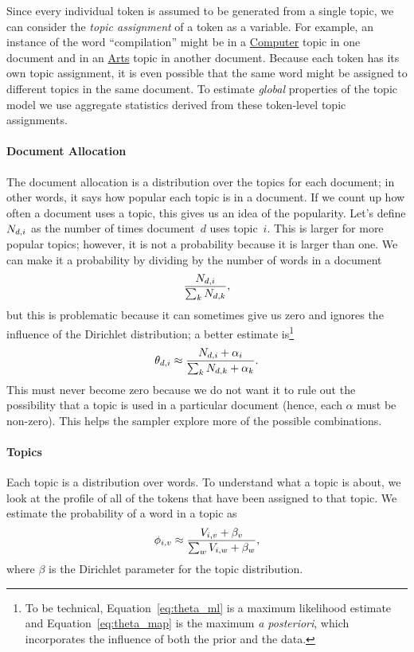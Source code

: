 Since every individual token is assumed to be generated from a single topic,
we can consider the {\em topic assignment} of a token as a variable.  For example,
an instance of the word ``compilation'' might be in a \underline{Computer} topic in one
document and in an \underline{Arts} topic in another document.  Because each token has its own
topic assignment, it is even possible that the
same word might be assigned to different topics in the same document.
To estimate \emph{global} properties of the topic model we use aggregate statistics derived from these token-level topic assignments.

\paragraph{Document Allocation} The document allocation is a distribution over
the topics for each document; in other words, it says how popular each topic is
in a document.  If we count up how often a document uses a topic, this gives us
an idea of the popularity.  Let's define $N_{d,i}$ as the number of times
document~$d$ uses topic~$i$.  This is larger for more popular topics;
however, it is not a probability because it is larger than one.  We can make it a
probability by dividing by the number of words in a document
\begin{equation}
\frac{N_{d,i}}{\sum_k N_{d,k}},
\label{eq:theta_ml}
\end{equation}
but this is problematic because it can sometimes give us zero and ignores the
influence of the Dirichlet distribution; a better estimate is\footnote{To be
  technical, Equation~\ref{eq:theta_ml} is a maximum likelihood estimate and
  Equation~\ref{eq:theta_map} is the maximum \textit{a posteriori}, which
  incorporates the influence of both the prior and the data.}
\begin{equation}
\theta_{d,i} \approx \frac{N_{d,i} + \alpha_i}{\sum_k N_{d,k} + \alpha_k}.
\label{eq:theta_map}
\end{equation}
This must never become zero because we do not want it to rule out the possibility
that a topic is used in a particular document (hence, each $\alpha$
must be non-zero).  This helps the sampler
explore more of the possible combinations.

\paragraph{Topics}

Each topic is a distribution over words.  To understand what a topic is about,
we look at the profile of all of the tokens that have been assigned to that
topic.  We estimate the probability of a word in a topic as
\begin{equation}
\phi_{i,v} \approx \frac{V_{i,v} + \beta_v}{\sum_w V_{i,w} + \beta_w},
\label{eq:phi_map}
\end{equation}
where $\beta$ is the Dirichlet parameter for the topic distribution.

